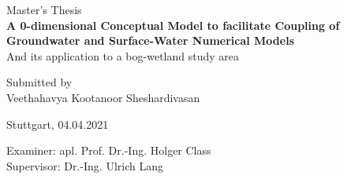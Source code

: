 \begin{center}
   {\large Master's Thesis}\\[0.5cm]
  {\bfseries {\LARGE A 0-dimensional Conceptual Model to facilitate Coupling of Groundwater and Surface-Water Numerical Models\\[0.3cm]}}
  {\large And its application to a bog-wetland study area}\\[0.5cm]
\end{center}

\vspace{4cm}

\begin{center}
  {\normalsize Submitted by}\\[0.1cm]
  {\large Veethahavya Kootanoor Sheshardivasan}\\[0.1cm]
\end{center}

\vspace{1.5cm}

\begin{center}
  {\large Stuttgart, 04.04.2021}
\end{center}

\vspace{1cm}

\begin{center}
  {\large 
  Examiner: apl. Prof. Dr.-Ing. Holger Class\\
  Supervisor: Dr.-Ing. Ulrich Lang
  }\\[0.1cm]
\end{center}

\endinput